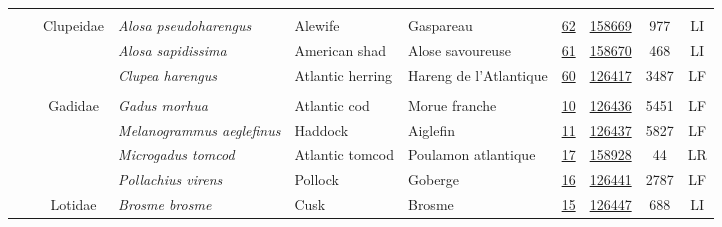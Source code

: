 \documentclass[12pt]{article}\usepackage[]{graphicx}\usepackage[]{color}
\begin{document}
\begin{landscapepage}
\begin{longtable}[t]{ccc>{\centering\arraybackslash}p{3cm}>{\centering\arraybackslash}p{3cm}>{\centering\arraybackslash}p{3cm}>{}c>{}ccc}
\addlinespace[0.3em]
\\
\hspace{1em}\hspace{1em} &  & Clupeidae & \em{Alosa pseudoharengus} & Alewife & Gaspareau & \href{#sec:14}{62} & \href{http://www.marinespecies.org/aphia.php?p=taxdetails&id=158962}{158669} & 977 & LI\\
\hspace{1em}\hspace{1em} &  &  & \em{Alosa sapidissima} & American shad & Alose savoureuse & \href{#sec:15}{61} & \href{http://www.marinespecies.org/aphia.php?p=taxdetails&id=126447}{158670} & 468 & LI\\
\hspace{1em}\hspace{1em} &  &  & \em{Clupea harengus} & Atlantic herring & Hareng de l'Atlantique & \href{#sec:16}{60} & \href{http://www.marinespecies.org/aphia.php?p=taxdetails&id=126441}{126417} & 3487 & LF\\
\addlinespace[0.3em]
\\
\hspace{1em}\hspace{1em} &  & Gadidae & \em{Gadus morhua} & Atlantic cod & Morue franche & \href{#sec:17}{10} & \href{http://www.marinespecies.org/aphia.php?p=taxdetails&id=158928}{126436} & 5451 & LF\\
\hspace{1em}\hspace{1em} &  &  & \em{Melanogrammus aeglefinus} & Haddock & Aiglefin & \href{#sec:19}{11} & \href{http://www.marinespecies.org/aphia.php?p=taxdetails&id=158748}{126437} & 5827 & LF\\
\hspace{1em}\hspace{1em} &  &  & \em{Microgadus tomcod} & Atlantic tomcod & Poulamon atlantique & \href{#sec:112}{17} & \href{http://www.marinespecies.org/aphia.php?p=taxdetails&id=158988}{158928} & 44 & LR\\
\hspace{1em}\hspace{1em} &  &  & \em{Pollachius virens} & Pollock & Goberge & \href{#sec:114}{16} & \href{http://www.marinespecies.org/aphia.php?p=taxdetails&id=126450}{126441} & 2787 & LF\\
\hspace{1em}\hspace{1em} &  & Lotidae & \em{Brosme brosme} & Cusk & Brosme & \href{#sec:410}{15} & \href{http://www.marinespecies.org/aphia.php?p=taxdetails&id=183289}{126447} & 688 & LI\\

\end{longtable}
\end{landscapepage}
\end{document}
